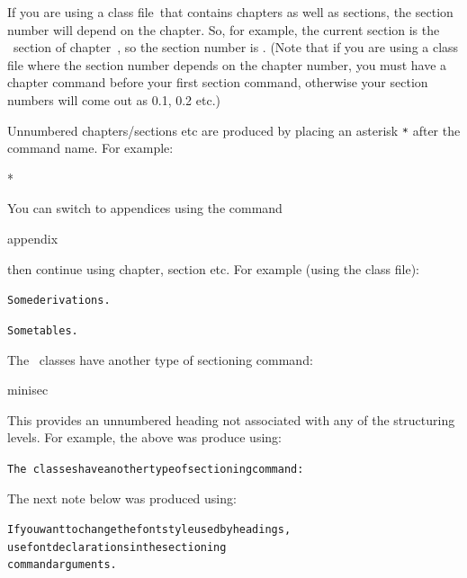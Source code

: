 \renewcommand{\fmtord}[1]{\textsuperscript{#1}}%
If you are using a class file\indexCLS\ that contains chapters as
well as sections, the section number will depend on the chapter.  So,
for example, the current section is the \ section
of chapter~, so the section number is \thesection.
(Note that if
you are using a class file where the section number depends on the
chapter number, you must have a \gls{chapter} command before your
first \gls{section} command, otherwise your section numbers will
come out as 0.1, 0.2 etc.)

Unnumbered chapters/sections etc are produced by placing an 
asterisk \texttt{*} after the command name.  For example:
\begin{codeS}
*
\end{codeS}

You can switch to appendices using the 
command
\begin{definition}
\gls{appendix}
\end{definition}%
then continue using \gls{chapter}, \gls{section} 
etc.  For example (using the  class file):
\begin{code}
\begin{alltt}
Some derivations.

Some tables.
\end{alltt}
\end{code}

The \koma\ classes have another type of sectioning command:
\begin{definition}
\gls{minisec}
\end{definition}\screenpagebreak
This provides an unnumbered heading not associated with any of the
structuring levels. For example, the above was produce using:
\begin{code}
\begin{alltt}
The \koma\ classes have another type of sectioning command:
\end{alltt}
\end{code}
The next note below was produced using:
\begin{code}
\begin{alltt}
If you want to change the font style used by headings, 
 use font declarations in the sectioning
command arguments.
\end{alltt}
\end{code}

